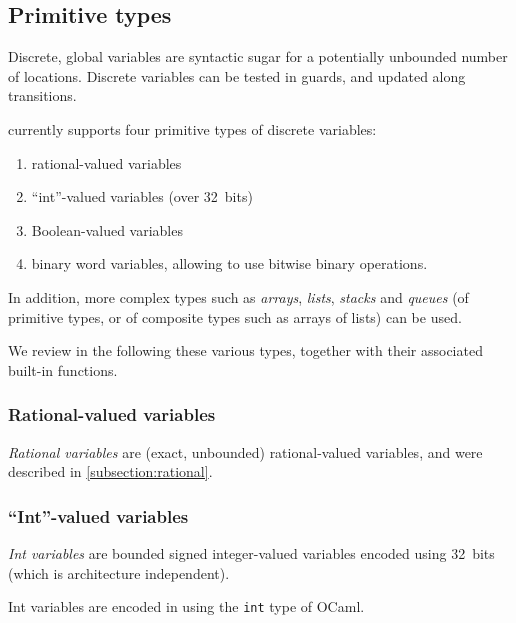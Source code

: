 \subsection{Primitive types}

Discrete, global variables are syntactic sugar for a potentially unbounded number of locations.
Discrete variables can be tested in guards, and updated along transitions.

\imitator{} currently supports four primitive types of discrete variables:
\begin{enumerate}
	\item rational-valued variables
	\item ``int''-valued variables (over 32~bits)
	\item Boolean-valued variables
	\item binary word variables, allowing to use bitwise binary operations.
\end{enumerate}

In addition, more complex types such as \emph{arrays}, \emph{lists}, \emph{stacks} and \emph{queues} (of primitive types, or of composite types such as arrays of lists) can be used.

We review in the following these various types, together with their associated built-in functions.


\subsubsection{Rational-valued variables}

\emph{Rational variables} are (exact, unbounded) rational-valued variables, and were described in \cref{subsection:rational}.

\subsubsection{``Int''-valued variables}\label{sss:int}

\emph{Int variables} are bounded signed integer-valued variables encoded using 32~bits (which is architecture independent).

Int variables are encoded in \imitator{} using the \texttt{int} type of OCaml.

